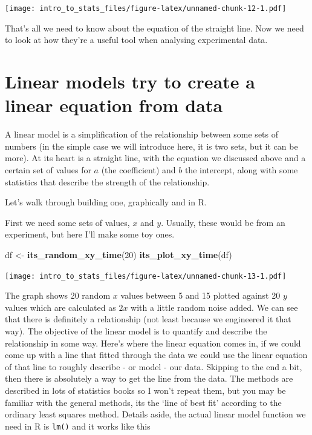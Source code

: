 \documentclass[
]{book}
\newenvironment{Shaded}{\begin{snugshade}}{\end{snugshade}}
\newcommand{\DecValTok}[1]{\textcolor[rgb]{0.00,0.00,0.81}{#1}}
\newcommand{\KeywordTok}[1]{\textcolor[rgb]{0.13,0.29,0.53}{\textbf{#1}}}
\newcommand{\NormalTok}[1]{#1}
\newcommand{\StringTok}[1]{\textcolor[rgb]{0.31,0.60,0.02}{#1}}
\begin{document}
\texttt{[image: intro\_to\_stats\_files/figure-latex/unnamed-chunk-12-1.pdf]}

That's all we need to know about the equation of the straight line. Now we need to look at how they're a useful tool when analysing experimental data.

\hypertarget{linear-models-try-to-create-a-linear-equation-from-data}{%
\section{Linear models try to create a linear equation from data}\label{linear-models-try-to-create-a-linear-equation-from-data}}

A linear model is a simplification of the relationship between some sets of numbers (in the simple case we will introduce here, it is two sets, but it can be more). At its heart is a straight line, with the equation we discussed above and a certain set of values for \(a\) (the coefficient) and \(b\) the intercept, along with some statistics that describe the strength of the relationship.

Let's walk through building one, graphically and in R.

First we need some sets of values, \(x\) and \(y\). Usually, these would be from an experiment, but here I'll make some toy ones.

\begin{Shaded}
\begin{Highlighting}[]
\NormalTok{df <-}\StringTok{ }\KeywordTok{its_random_xy_time}\NormalTok{(}\DecValTok{20}\NormalTok{)}
\KeywordTok{its_plot_xy_time}\NormalTok{(df)}
\end{Highlighting}
\end{Shaded}

\texttt{[image: intro\_to\_stats\_files/figure-latex/unnamed-chunk-13-1.pdf]}

The graph shows 20 random \(x\) values between 5 and 15 plotted against 20 \(y\) values which are calculated as \(2x\) with a little random noise added. We can see that there is definitely a relationship (not least because we engineered it that way). The objective of the linear model is to quantify and describe the relationship in some way. Here's where the linear equation comes in, if we could come up with a line that fitted through the data we could use the linear equation of that line to roughly describe - or model - our data. Skipping to the end a bit, then there is absolutely a way to get the line from the data. The methods are described in lots of statistics books so I won't repeat them, but you may be familiar with the general methods, its the `line of best fit' according to the ordinary least squares method. Details aside, the actual linear model function we need in R is \texttt{lm()} and it works like this
\end{document}
